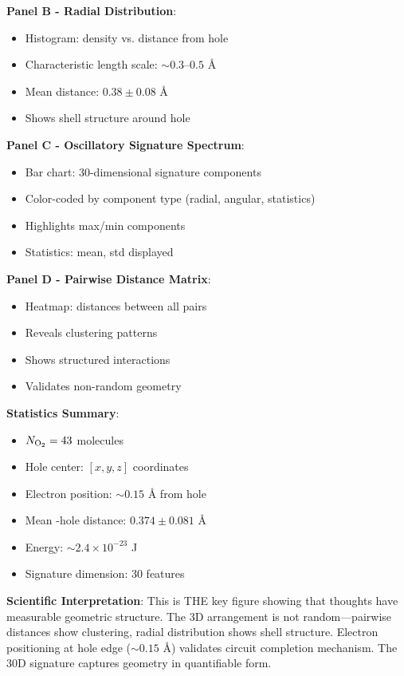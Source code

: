 \documentclass[11pt]{article}
\begin{document}
\textbf{Panel B - Radial Distribution}:
\begin{itemize}
\item Histogram:  density vs. distance from hole
\item Characteristic length scale: $\sim 0.3$--$0.5$ Å
\item Mean distance: $0.38 \pm 0.08$ Å
\item Shows shell structure around hole
\end{itemize}

\textbf{Panel C - Oscillatory Signature Spectrum}:
\begin{itemize}
\item Bar chart: 30-dimensional signature components
\item Color-coded by component type (radial, angular, statistics)
\item Highlights max/min components
\item Statistics: mean, std displayed
\end{itemize}

\textbf{Panel D - Pairwise Distance Matrix}:
\begin{itemize}
\item Heatmap: distances between all  pairs
\item Reveals clustering patterns
\item Shows structured interactions
\item Validates non-random geometry
\end{itemize}

\textbf{Statistics Summary}:
\begin{itemize}
\item $N_{\ce{O2}} = 43$ molecules
\item Hole center: $[x, y, z]$ coordinates
\item Electron position: $\sim 0.15$ Å from hole
\item Mean -hole distance: $0.374 \pm 0.081$ Å
\item Energy: $\sim 2.4 \times 10^{-23}$ J
\item Signature dimension: 30 features
\end{itemize}

\textbf{Scientific Interpretation}:
This is THE key figure showing that thoughts have measurable geometric structure. The 3D arrangement is not random—pairwise distances show clustering, radial distribution shows shell structure. Electron positioning at hole edge ($\sim 0.15$ Å) validates circuit completion mechanism. The 30D signature captures geometry in quantifiable form.
\end{document}
